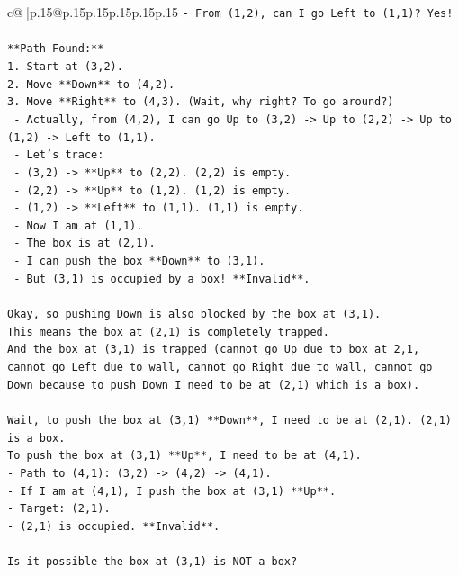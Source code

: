 \documentclass{article}
\begin{document}
{\begin{supertabular}{c@{$\;$}|p{.15\linewidth}@{}p{.15\linewidth}p{.15\linewidth}p{.15\linewidth}p{.15\linewidth}p{.15\linewidth}}
{{{\texttt{{-} From (1,2), can I go Left to (1,1)? Yes!} \\
\\ 
\texttt{**Path Found:**} \\
\texttt{1.  Start at (3,2).} \\
\texttt{2.  Move **Down** to (4,2).} \\
\texttt{3.  Move **Right** to (4,3). (Wait, why right? To go around?)} \\
\texttt{    {-} Actually, from (4,2), I can go Up to (3,2) {-}> Up to (2,2) {-}> Up to (1,2) {-}> Left to (1,1).} \\
\texttt{    {-} Let's trace:} \\
\texttt{      {-} (3,2) {-}> **Up** to (2,2). (2,2) is empty.} \\
\texttt{      {-} (2,2) {-}> **Up** to (1,2). (1,2) is empty.} \\
\texttt{      {-} (1,2) {-}> **Left** to (1,1). (1,1) is empty.} \\
\texttt{    {-} Now I am at (1,1).} \\
\texttt{    {-} The box is at (2,1).} \\
\texttt{    {-} I can push the box **Down** to (3,1).} \\
\texttt{    {-} But (3,1) is occupied by a box! **Invalid**.} \\
\\ 
\texttt{Okay, so pushing Down is also blocked by the box at (3,1).} \\
\texttt{This means the box at (2,1) is completely trapped.} \\
\texttt{And the box at (3,1) is trapped (cannot go Up due to box at 2,1, cannot go Left due to wall, cannot go Right due to wall, cannot go Down because to push Down I need to be at (2,1) which is a box).} \\
\\ 
\texttt{Wait, to push the box at (3,1) **Down**, I need to be at (2,1). (2,1) is a box.} \\
\texttt{To push the box at (3,1) **Up**, I need to be at (4,1).} \\
\texttt{{-} Path to (4,1): (3,2) {-}> (4,2) {-}> (4,1).} \\
\texttt{{-} If I am at (4,1), I push the box at (3,1) **Up**.} \\
\texttt{{-} Target: (2,1).} \\
\texttt{{-} (2,1) is occupied. **Invalid**.} \\
\\ 
\texttt{Is it possible the box at (3,1) is NOT a box?} \\
}}}
\end{supertabular}}
\end{document}
